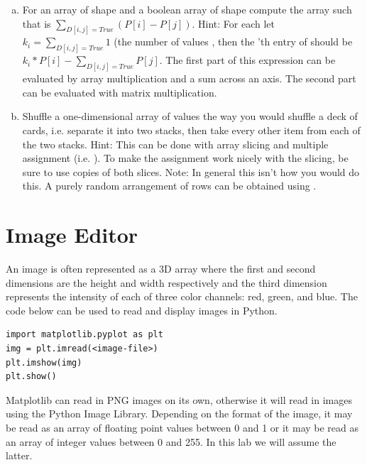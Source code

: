 \begin{problem}
\begin{enumerate}[a)]
\item For an array  of shape  and a boolean array of shape  compute the array  such that  is $\sum_{D[i,j] = True} \left( P[i] - P[j]\right)$.
Hint: For each  let $k_i = \sum_{D[i,j] = True} 1$ (the number of  values , then the 'th entry of  should be $k_i * P[i] - \sum_{D[i,j] = True} P[j]$.
The first part of this expression can be evaluated by array multiplication and a sum across an axis.
The second part can be evaluated with matrix multiplication.

\item Shuffle a one-dimensional array of values the way you would shuffle a deck of cards, i.e. separate it into two stacks, then take every other item from each of the two stacks.
Hint: This can be done with array slicing and multiple assignment (i.e. ).
To make the assignment work nicely with the slicing, be sure to use copies of both slices.
Note: In general this isn't how you would do this.
A purely random arrangement of rows can be obtained using .

\end{enumerate}
\end{problem}

\section*{Image Editor}
An image is often represented as a 3D array where the first and second dimensions are the height and width respectively and the third dimension represents the intensity of each of three color channels: red, green, and blue.
The code below can be used to read and display images in Python.
\begin{lstlisting}
import matplotlib.pyplot as plt
img = plt.imread(<image-file>)
plt.imshow(img)
plt.show()
\end{lstlisting}

Matplotlib can read in PNG images on its own, otherwise it will read in images using the Python Image Library.
Depending on the format of the image, it may be read as an array of floating point values between 0 and 1 or it may be read as an array of integer values between 0 and 255.
In this lab we will assume the latter.

